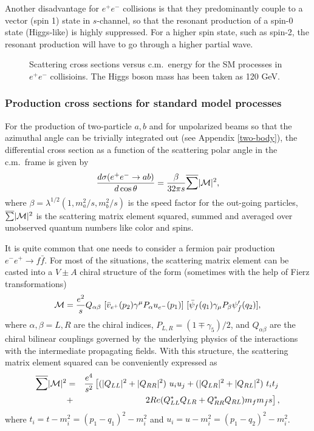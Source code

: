 \documentclass[prd,aps,floats,preprintnumbers,preprint,superscriptaddress,floatfix,nofootinbib]{revtex4}
\def\cM{{\cal M}}
\def\epem{e^+e^-}
\def\bea{\begin{eqnarray}}
\def\eea{\end{eqnarray}}
\begin{document}
Another disadvantage for $\epem$ collisions is that they predominantly couple
to a vector (spin 1) state in $s$-channel, so that the resonant production
of a spin-0 state (Higgs-like) is highly suppressed.  For a higher spin state,
such as spin-2, the resonant production will have to go through a higher
partial wave. 

\begin{figure}[t,b]
\caption{Scattering cross sections versus c.m.~energy for the SM processes in $e^+e^-$
collisioins. The Higgs boson mass has been taken as 120 GeV.}
\label{fig:epem}
\end{figure}

\subsubsection{Production cross sections for standard model processes}
 
For the production of  two-particle $a,b$ and for unpolarized beams so that the
azimuthal angle can be trivially integrated out  (see Appendix \ref{two-body}),
the differential cross section as a function of the scattering polar angle in the
c.m.~frame is given by
\bea
{d\sigma(e^+e^-\to ab) \over d\cos\theta} = \frac{\beta}{32\pi s}  
\overline{ \sum} |\cM|^2 ,
\label{dsdc}
\eea
where $\beta=\lambda^{1/2}(1, m_a^2/s, m_b^2/s)$ is the speed factor
for the out-going particles,  $\overline{\sum}|\cM|^2$ is 
the scattering matrix element squared, 
summed and averaged over unobserved quantum numbers
like color and spins. 

It is quite common that one needs to consider a fermion pair production
$e^-e^+\to f\bar f$. For most of the situations, the scattering matrix element
can be casted into a $V\pm A$ chiral structure of the form (sometimes with
the help of Fierz transformations)
\bea
\cM = {e^2 \over s} Q_{\alpha\beta}\ 
[\bar v_{e^+}(p_2) \gamma^\mu P_\alpha u_{e^-}(p_1)]\ 
   [\bar \psi_f(q_1) \gamma_\mu P_\beta \psi'_{\bar f}(q_2)],
\label{me}
\eea
where $\alpha, \beta=L, R$ are the  chiral indices, $P_{L,R}^{}=(1\mp \gamma_5)/2$, 
and $Q_{\alpha\beta}$ are the chiral bilinear couplings governed by the underlying
physics of the interactions with the intermediate propagating fields. With this
structure, the  scattering matrix element squared can be conveniently
expressed as
\bea 
\nonumber
\overline{ \sum} |\cM|^2 &=& {e^4 \over s^2} \left[
( |Q_{LL}|^2 + |Q_{RR}|^2 )\ u_i u_j +
( |Q_{LR}|^2 + |Q_{RL}|^2 )\ t_i t_j  \right.  \\
&+& \left. 2Re ( Q_{LL}^* Q_{LR} + Q_{RR}^*Q_{RL} ) m_f m_{\bar f} s \right],
\label{sqme}
\eea
where $t_i=t-m_i^2=(p_1-q_1)^2-m_i^2$ and $u_i=u-m_i^2=(p_1-q_2)^2-m_i^2$.
\end{document}

